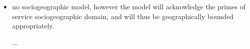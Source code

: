 \begin{itemize}
\item no sociogeographic model, however the model will acknowledge the primes of service sociogeographic domain, and will thus be geographically bounded appropriately.

...
\end{itemize}